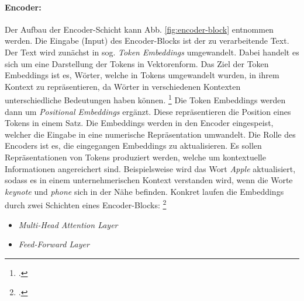 \paragraph{Encoder:}
Der Aufbau der Encoder-Schicht kann Abb. \ref{fig:encoder-block} entnommen werden. Die Eingabe (Input) des Encoder-Blocks ist der zu verarbeitende Text. Der Text wird zunächst in sog. \emph{Token Embeddings} umgewandelt. Dabei handelt es sich um eine Darstellung der Tokens in Vektorenform. Das Ziel der Token Embeddings ist es, Wörter, welche in Tokens umgewandelt wurden, in ihrem Kontext zu repräsentieren, da Wörter in verschiedenen Kontexten unterschiedliche Bedeutungen haben können. \footcites[Vgl.][S. 692]{popa_towards_2021} Die Token Embeddings werden dann um \emph{Positional Embeddings} ergänzt. Diese repräsentieren die Position eines Tokens in einem Satz. Die Embeddings werden in den Encoder eingespeist, welcher die Eingabe in eine numerische Repräsentation umwandelt. Die Rolle des Encoders ist es, die eingegangen Embeddings zu aktualisieren. Es sollen Repräsentationen von Tokens produziert werden, welche um kontextuelle Informationen angereichert sind. Beispielsweise wird das Wort \emph{Apple} aktualisiert, sodass es in einem unternehmerischen Kontext verstanden wird, wenn die Worte \emph{keynote} und \emph{phone} sich in der Nähe befinden. Konkret laufen die Embeddings durch zwei Schichten eines Encoder-Blocks: \footcites[Vgl.][S. 58 ff.]{tunstall_natural_2022}
\begin{itemize}
    \item \emph{Multi-Head Attention Layer}
    \item \emph{Feed-Forward Layer}
\end{itemize}

